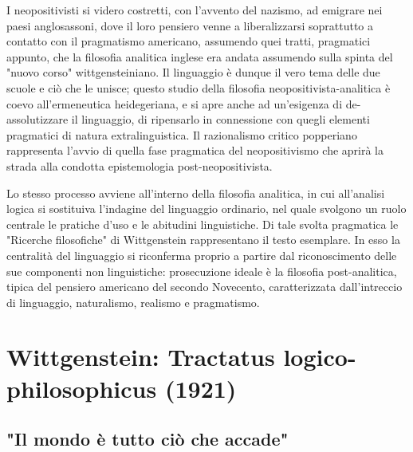 I neopositivisti
si videro costretti, con l'avvento del nazismo,
ad emigrare nei paesi anglosassoni, dove il loro
pensiero venne a liberalizzarsi soprattutto
a contatto con il pragmatismo americano,
assumendo quei tratti, pragmatici appunto, che
la filosofia analitica inglese era andata
assumendo sulla spinta del "nuovo corso"
wittgensteiniano.
Il linguaggio è dunque il vero tema delle due scuole e ciò
che le unisce; questo studio della filosofia
neopositivista-analitica è coevo all'ermeneutica
heidegeriana, e si apre anche ad un'esigenza
di de-assolutizzare il linguaggio, di ripensarlo
in connessione con quegli elementi pragmatici di
natura extralinguistica. Il razionalismo critico
popperiano rappresenta l'avvio di quella fase
pragmatica del neopositivismo che aprirà la
strada alla condotta epistemologia post-neopositivista.


Lo stesso processo avviene all'interno della filosofia
analitica, in cui all'analisi logica si sostituiva
l'indagine del linguaggio ordinario, nel quale
svolgono un ruolo centrale le pratiche d'uso e le
abitudini linguistiche. Di tale svolta pragmatica
le "Ricerche filosofiche" di Wittgenstein
rappresentano il testo esemplare. In esso la
centralità del linguaggio si riconferma proprio
a partire dal riconoscimento delle sue
componenti non linguistiche: prosecuzione
ideale è la filosofia post-analitica, tipica del
pensiero americano del secondo Novecento,
caratterizzata dall'intreccio di linguaggio,
naturalismo, realismo e pragmatismo.

\section{Wittgenstein: Tractatus logico-philosophicus (1921)}

\subsection{"Il mondo è tutto ciò che accade"}
